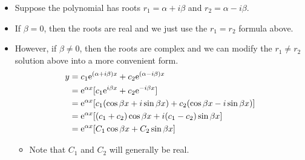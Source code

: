 \documentclass[../main.tex]{subfiles}
\begin{document}
\begin{itemize}
    \begin{itemize}
        \item Suppose the polynomial has roots $r_1=\alpha+i\beta$ and $r_2=\alpha-i\beta$.
        \item If $\beta=0$, then the roots are real and we just use the $r_1=r_2$ formula above.
        \item However, if $\beta\neq 0$, then the roots are complex and we can modify the $r_1\neq r_2$ solution above into a more convenient form.
        \begin{align*}
            y &= c_1\e[(\alpha+i\beta)x]+c_2\e[(\alpha-i\beta)x]\\
            &= \e[\alpha x][c_1\e[i\beta x]+c_2\e[-i\beta x]]\\
            &= \e[\alpha x][c_1(\cos\beta x+i\sin\beta x)+c_2(\cos\beta x-i\sin\beta x)]\\
            &= \e[\alpha x][(c_1+c_2)\cos\beta x+i(c_1-c_2)\sin\beta x]\\
            &= \e[\alpha x][C_1\cos\beta x+C_2\sin\beta x]
        \end{align*}
        \begin{itemize}
            \item Note that $C_1$ and $C_2$ will generally be real.
        \end{itemize}
    \end{itemize}
\end{itemize}
\end{document}
